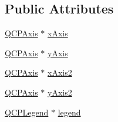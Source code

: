 \subsection*{Public Attributes}
\begin{DoxyCompactItemize}
\item 
\hyperlink{class_q_c_p_axis}{Q\+C\+P\+Axis} $\ast$ \hyperlink{class_q_custom_plot_a9a79cd0158a4c7f30cbc702f0fd800e4}{x\+Axis}
\item 
\hyperlink{class_q_c_p_axis}{Q\+C\+P\+Axis} $\ast$ \hyperlink{class_q_custom_plot_af6fea5679725b152c14facd920b19367}{y\+Axis}
\item 
\hyperlink{class_q_c_p_axis}{Q\+C\+P\+Axis} $\ast$ \hyperlink{class_q_custom_plot_ada41599f22cad901c030f3dcbdd82fd9}{x\+Axis2}
\item 
\hyperlink{class_q_c_p_axis}{Q\+C\+P\+Axis} $\ast$ \hyperlink{class_q_custom_plot_af13fdc5bce7d0fabd640f13ba805c0b7}{y\+Axis2}
\item 
\hyperlink{class_q_c_p_legend}{Q\+C\+P\+Legend} $\ast$ \hyperlink{class_q_custom_plot_a4eadcd237dc6a09938b68b16877fa6af}{legend}
\end{DoxyCompactItemize}
